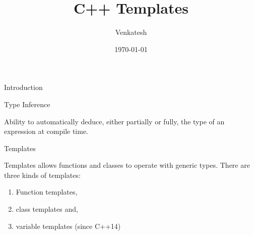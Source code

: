 \documentclass{beamer}
\title[Short title]{C++ Templates} %
\author{Venkatesh} %
\institute{WDC}
\date{\today} %
\begin{document}
\begin{frame}
\titlepage %
\end{frame}




\begin{frame}{Introduction}

Type Inference

Ability to automatically deduce, either partially or fully, the type of an expression at compile time.

\end{frame}


\begin{frame}{Templates}

Templates allows functions and classes to operate with generic types. 
There are three kinds of templates:
\begin{enumerate}
\item<1-> Function templates,
\item<2-> class templates and,
\item<3-> variable templates (since C++14)
\end{enumerate}
\end{frame}






\end{document}
